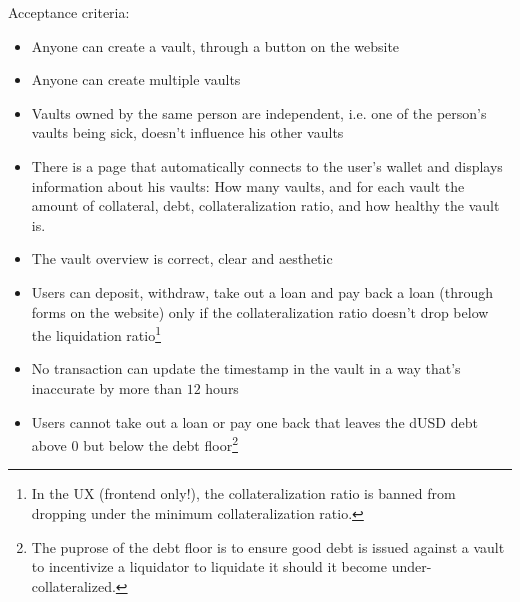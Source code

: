 \documentclass{article} %
\begin{document}
Acceptance criteria:
\begin{itemize}
  \item Anyone can create a vault, through a button on the website
  \item Anyone can create multiple vaults
  \item Vaults owned by the same person are independent, i.e. one of the
    person's vaults being sick, doesn't influence his other vaults
  \item There is a page that automatically connects to the user's wallet and
    displays information about his vaults: How many vaults, and for each vault
    the amount of collateral, debt, collateralization ratio, and how healthy the
    vault is.
  \item The vault overview is correct, clear and aesthetic
  \item Users can deposit, withdraw, take out a loan and pay back a loan
    (through forms on the website) only if the collateralization ratio doesn't
    drop below the liquidation ratio\footnote{
      In the UX (frontend only!), the collateralization ratio is banned from
      dropping under the minimum collateralization ratio.}
  \item No transaction can update the timestamp in the vault in a way that's
    inaccurate by more than $12$ hours
  \item Users cannot take out a loan or pay one back that leaves the dUSD debt
    above $0$ but below the debt floor\footnote{
    The puprose of the debt floor is to ensure good debt is issued against a
    vault to incentivize a liquidator to liquidate it should it become
    under-collateralized.}
%


\end{itemize}
\end{document}
